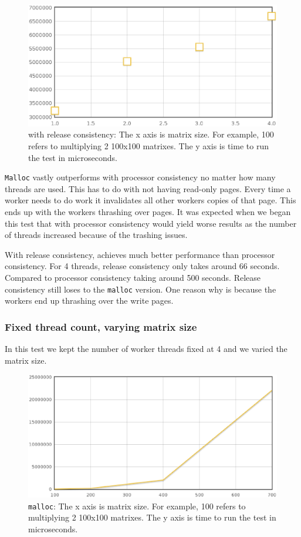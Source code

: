 \begin{figure}[!h]
\centering
\includegraphics[scale=0.40]{images/mmlh-fixed-size.eps}
\caption{\projname{} with release consistency: The x axis is matrix size. For example, 100 refers to multiplying 2 100x100 matrixes. The y axis is time to run the test in microseconds.}
\end{figure}

\verb,Malloc, vastly outperforms \projname{} with processor consistency no matter how many threads are used.  This has to do with not having read-only pages.  Every time a worker needs to do work it invalidates all other workers copies of that page.  This ends up with the workers thrashing over pages.  It was expected when we began this test that \projname{} with processor consistency would yield worse results as the number of threads increased because of the trashing issues.

With release consistency, \projname{} achieves much better performance than processor consistency.  For 4 threads, release consistency only takes around 66 seconds.  Compared to processor consistency taking around 500 seconds.  Release consistency still loses to the \verb,malloc, version.  One reason why is because the workers end up thrashing over the write pages.

\subsubsection{Fixed thread count, varying matrix size}

In this test we kept the number of worker threads fixed at 4 and we varied the matrix size.

\begin{figure}[!h]
\centering
\includegraphics[scale=0.40]{images/malloc-fixed-thread.eps}
\caption{\verb,malloc,: The x axis is matrix size. For example, 100 refers to multiplying 2 100x100 matrixes. The y axis is time to run the test in microseconds.}
\end{figure}

